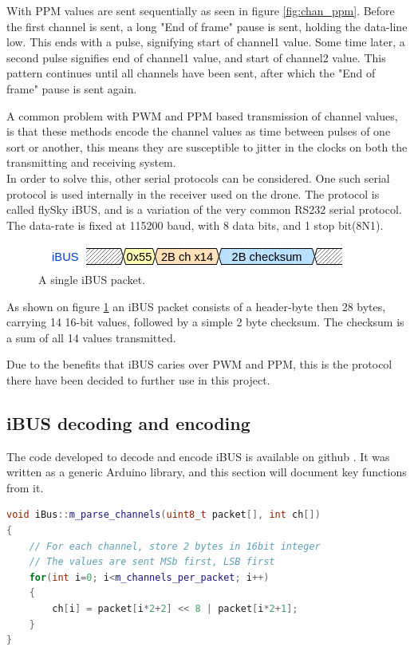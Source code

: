 With PPM values are sent sequentially as seen in figure \ref{fig:chan_ppm}. Before the first channel is sent, a long "End of frame" pause is sent, holding the data-line low. This ends with a pulse, signifying start of channel1 value. Some time later, a second pulse signifies end of channel1 value, and start of channel2 value. This pattern continues until all channels have been sent, after which the "End of frame" pause is sent again.

A common problem with PWM and PPM based transmission of channel values, is that these methods encode the channel values as time between pulses of one sort or another, this means they are susceptible to jitter in the clocks on both the transmitting and receiving system.\\
In order to solve this, other serial protocols can be considered.
One such serial protocol is used internally in the receiver used on the drone. The protocol is called flySky iBUS, and is a variation of the very common RS232 serial protocol. The data-rate is fixed at 115200 baud, with 8 data bits, and 1 stop bit(8N1).

\begin{figure}[h]
    \centering
    \includegraphics[width=0.8\columnwidth]{figures/ch_design/iBUS.png}
    \caption{A single iBUS packet.}
    \label{fig:iBUS}
\end{figure}

As shown on figure \ref{fig:iBUS} an iBUS packet consists of a header-byte then 28 bytes, carrying 14 16-bit values, followed by a simple 2 byte checksum. The checksum is a sum of all 14 values transmitted.

Due to the benefits that iBUS caries over PWM and PPM, this is the protocol there have been decided to further use in this project.

\subsection*{iBUS decoding and encoding}\label{iBUS library}

The code developed to decode and encode iBUS is available on github \cite{ibus-lib}.
It was written as a generic Arduino library, and this section will document key functions from it.

\begin{lstlisting}[language=C++, caption={Parser for iBUS packets.\label{lst:IBUSCL}}] 
void iBus::m_parse_channels(uint8_t packet[], int ch[])
{
	// For each channel, store 2 bytes in 16bit integer
	// The values are sent MSb first, LSB first
	for(int i=0; i<m_channels_per_packet; i++)
	{
		ch[i] = packet[i*2+2] << 8 | packet[i*2+1];
	}
}
\end{lstlisting} 

